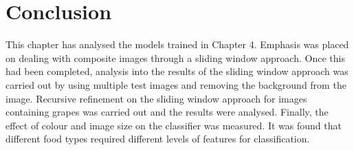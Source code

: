 \section{Conclusion}
This chapter has analysed the models trained in Chapter 4.
Emphasis was placed on dealing with composite images through a sliding window approach.
Once this had been completed, analysis into the results of the sliding window approach was carried out by using multiple test images and removing the background from the image.
Recursive refinement on the sliding window approach for images containing grapes was carried out and the results were analysed.
Finally, the effect of colour and image size on the classifier was measured.
It was found that different food types required different levels of features for classification.
% 

